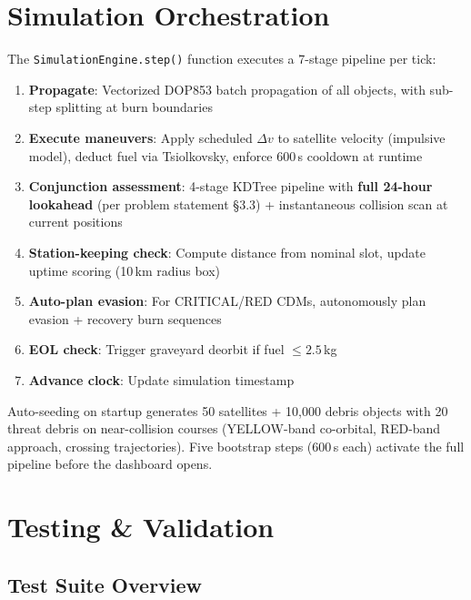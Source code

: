 \documentclass[11pt,a4paper]{article}
\begin{document}
\section{Simulation Orchestration}

The \texttt{SimulationEngine.step()} function executes a 7-stage pipeline
per tick:

\begin{enumerate}[nosep]
  \item \textbf{Propagate}: Vectorized DOP853 batch propagation of all objects,
        with sub-step splitting at burn boundaries
  \item \textbf{Execute maneuvers}: Apply scheduled $\Delta v$ to satellite
        velocity (impulsive model), deduct fuel via Tsiolkovsky, enforce
        600\,s cooldown at runtime
  \item \textbf{Conjunction assessment}: 4-stage KDTree pipeline with
        \textbf{full 24-hour lookahead} (per problem statement \S3.3) +
        instantaneous collision scan at current positions
  \item \textbf{Station-keeping check}: Compute distance from nominal slot,
        update uptime scoring (10\,km radius box)
  \item \textbf{Auto-plan evasion}: For CRITICAL/RED CDMs, autonomously plan
        evasion + recovery burn sequences
  \item \textbf{EOL check}: Trigger graveyard deorbit if fuel $\leq 2.5$\,kg
  \item \textbf{Advance clock}: Update simulation timestamp
\end{enumerate}

Auto-seeding on startup generates 50 satellites + 10,000 debris objects with
20 threat debris on near-collision courses (YELLOW-band co-orbital,
RED-band approach, crossing trajectories). Five bootstrap steps (600\,s each)
activate the full pipeline before the dashboard opens.

\section{Testing \& Validation}

\subsection{Test Suite Overview}
\end{document}
